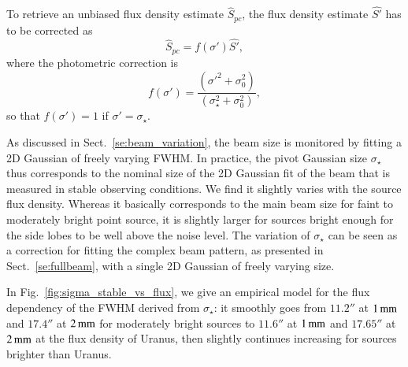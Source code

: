 To retrieve an unbiased flux density estimate $\hat{S}_{pc}$, the
flux density estimate $\hat{S'}$ has to be corrected as
\begin{equation}
  \hat{S}_{pc} = f(\sigma')\hat{S'},
\end{equation} 
where the photometric correction is 
\begin{equation}
  f(\sigma') = \frac{(\sigma'^2 + \sigma_0^2)}{(\sigma_\star^2+\sigma_0^2)}, 
\end{equation} 
so that $f(\sigma') = 1$ if $\sigma'=\sigma_\star$.

As discussed in Sect.~\ref{se:beam_variation}, the beam size is
monitored by fitting a 2D Gaussian of freely varying FWHM.
In practice, the pivot Gaussian size $\sigma_{\star}$ thus corresponds
to the nominal size of the 2D Gaussian fit of the beam that is
measured in stable observing conditions. We find it slightly varies with the
source flux density. Whereas it basically corresponds to the main beam
size for faint to moderately bright point source, it is slightly
larger for sources bright enough for the side lobes to be well above
the noise level. The variation of $\sigma_{\star}$ can be seen as a
correction for fitting the complex beam pattern, as presented in
Sect.~\ref{se:fullbeam}, with a single 2D Gaussian of freely varying
size.

In Fig.~\ref{fig:sigma_stable_vs_flux}, we give an
empirical model for the flux dependency of the FWHM derived from
$\sigma_{\star}$: it
smoothly goes from $11.2''$ at $1\,\rm{mm}$ and $17.4''$ at $2\,\rm{mm}$ for
moderately bright sources to $11.6''$ at $1\,\rm{mm}$ and $17.65''$ at
$2\,\rm{mm}$ at the flux density of Uranus,
then slightly continues increasing for sources brighter than Uranus.
